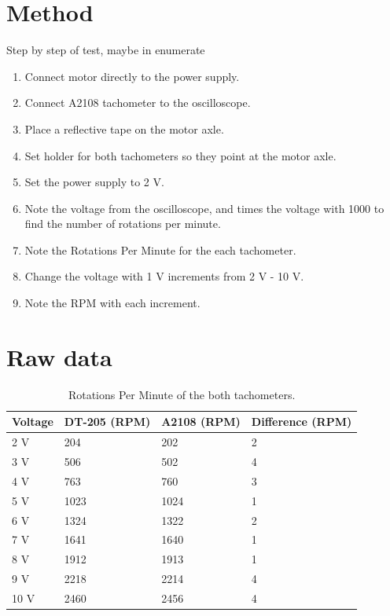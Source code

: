 \section*{Method}
Step by step of test, maybe in enumerate
\begin{enumerate}
\item Connect motor directly to the power supply.
\item Connect A2108 tachometer to the oscilloscope.
\item Place a reflective tape on the motor axle.
\item Set holder for both tachometers so they point at the motor axle.
\item Set the power supply to 2 V.
\item Note the voltage from the oscilloscope, and times the voltage with 1000 to find the number of rotations per minute.
\item Note the Rotations Per Minute for the each tachometer.
\item Change the voltage with 1 V increments from 2 V - 10 V.
\item Note the RPM with each increment.
\end{enumerate}
\section*{Raw data}
\begin{table}[htbp]
\centering
\caption{Rotations Per Minute of the both tachometers.}
\label{RPMData}
\begin{tabular}{llll}
Voltage & DT-205 {(}RPM{)} & A2108 {(}RPM{)} & Difference {(}RPM{)} \\ \hline  \rowcolor{lightGrey}
2 V     & 204              & 202             & 2                    \\
3 V     & 506              & 502             & 4                    \\  \rowcolor{lightGrey}
4 V     & 763              & 760             & 3                    \\ 
5 V     & 1023             & 1024            & 1                    \\  \rowcolor{lightGrey}
6 V     & 1324             & 1322            & 2                    \\
7 V     & 1641             & 1640            & 1                    \\  \rowcolor{lightGrey}
8 V     & 1912             & 1913            & 1                    \\
9 V     & 2218             & 2214            & 4                    \\ \rowcolor{lightGrey}
10 V    & 2460             & 2456            & 4                    
\end{tabular}
\end{table}

